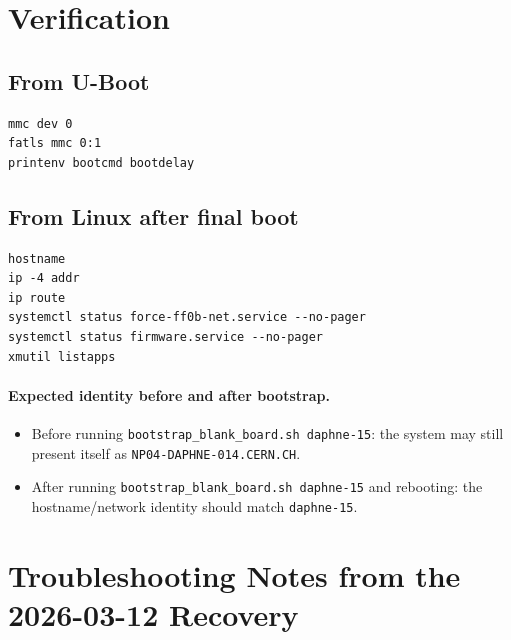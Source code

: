 \documentclass[a4paper,11pt]{article}
\begin{document}
\clearpage
\section{Verification}

\subsection*{From U-Boot}
\begin{listing}[H]
\begin{verbatim}
mmc dev 0
fatls mmc 0:1
printenv bootcmd bootdelay
\end{verbatim}
\caption{Basic U-Boot verification}
\end{listing}

\subsection*{From Linux after final boot}
\begin{listing}[H]
\begin{verbatim}
hostname
ip -4 addr
ip route
systemctl status force-ff0b-net.service --no-pager
systemctl status firmware.service --no-pager
xmutil listapps
\end{verbatim}
\caption{Final Linux verification}
\end{listing}

\paragraph{Expected identity before and after bootstrap.}
\begin{itemize}
  \item Before running \texttt{bootstrap\_blank\_board.sh daphne-15}: the system may
        still present itself as \texttt{NP04-DAPHNE-014.CERN.CH}.
  \item After running \texttt{bootstrap\_blank\_board.sh daphne-15} and rebooting:
        the hostname/network identity should match \texttt{daphne-15}.
\end{itemize}

\clearpage
\section{Troubleshooting Notes from the 2026-03-12 Recovery}
\end{document}
